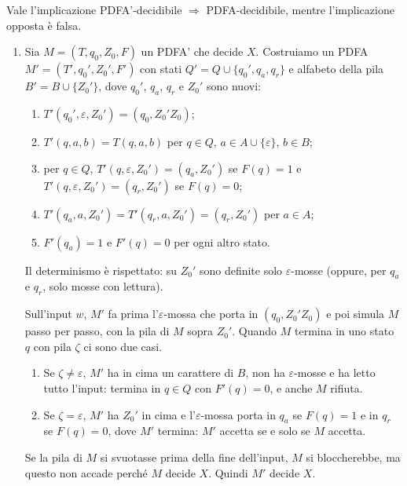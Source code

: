 \begin{sol}
Vale l'implicazione \glqq PDFA'-decidibile $\Rightarrow$ PDFA-decidibile\grqq, mentre l'implicazione opposta è falsa.
\ 
\begin{enumerate}
\item Sia $M=(T,q_0,Z_0,F)$ un PDFA' che decide $X$. Costruiamo un PDFA $M'=(T',q_0',Z_0',F')$ con stati $Q'=Q\cup\{q_0',q_a,q_r\}$ e alfabeto della pila $B'=B\cup\{Z_0'\}$, dove $q_0'$, $q_a$, $q_r$ e $Z_0'$ sono nuovi:
\ 
\begin{enumerate}
\item $T'(q_0',\varepsilon,Z_0')=(q_0,Z_0'Z_0)$;
\item $T'(q,a,b)=T(q,a,b)$ per $q\in Q$, $a\in A\cup\{\varepsilon\}$, $b\in B$;
\item per $q\in Q$, $T'(q,\varepsilon,Z_0')=(q_a,Z_0')$ se $F(q)=1$ e $T'(q,\varepsilon,Z_0')=(q_r,Z_0')$ se $F(q)=0$;
\item $T'(q_a,a,Z_0')=T'(q_r,a,Z_0')=(q_r,Z_0')$ per $a\in A$;
\item $F'(q_a)=1$ e $F'(q)=0$ per ogni altro stato.
\end{enumerate}
Il determinismo è rispettato: su $Z_0'$ sono definite solo $\varepsilon$-mosse (oppure, per $q_a$ e $q_r$, solo mosse con lettura).

Sull'input $w$, $M'$ fa prima l'$\varepsilon$-mossa che porta in $(q_0,Z_0'Z_0)$ e poi simula $M$ passo per passo, con la pila di $M$ sopra $Z_0'$. Quando $M$ termina in uno stato $q$ con pila $\zeta$ ci sono due casi.
\ 
\begin{enumerate}
\item Se $\zeta\neq\varepsilon$, $M'$ ha in cima un carattere di $B$, non ha $\varepsilon$-mosse e ha letto tutto l'input: termina in $q\in Q$ con $F'(q)=0$, e anche $M$ rifiuta.
\item Se $\zeta=\varepsilon$, $M'$ ha $Z_0'$ in cima e l'$\varepsilon$-mossa porta in $q_a$ se $F(q)=1$ e in $q_r$ se $F(q)=0$, dove $M'$ termina: $M'$ accetta se e solo se $M$ accetta.
\end{enumerate}
Se la pila di $M$ si svuotasse prima della fine dell'input, $M$ si bloccherebbe, ma questo non accade perché $M$ decide $X$. Quindi $M'$ decide $X$.


\end{enumerate}
\end{sol}
